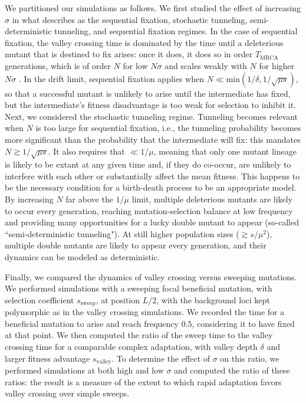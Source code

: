 \documentclass[rmp]{revtex4}
\begin{document}
We partitioned our simulations as follows.
We first studied the effect of increasing $\sigma$ in what \citet{weissman_2009} describes as the sequential fixation, stochastic tunneling, semi-deterministic tunneling, and sequential fixation regimes.
In the case of sequential fixation, the valley crossing time is dominated by the time until a deleterious mutant that is destined to fix arises: once it does, it does so in order $T_{\mathrm{MRCA}}$ generations, which is of order $N$ for low $N\sigma$ and scales weakly with $N$ for higher $N\sigma$ \citep{neher_hallatschek_2013}.
In the drift limit, sequential fixation applies when $N \ll \mathrm{min}(1/\delta, 1/\sqrt{\mu s})$, so that a successful mutant is unlikely to arise until the intermediate has fixed, but the intermediate's fitness disadvantage is too weak for selection to inhibit it.
Next, we considered the stochastic tunneling regime.
Tunneling becomes relevant when $N$ is too large for sequential fixation, i.e., the tunneling probability becomes more significant than the probability that the intermediate will fix: this mandates $N \gtrsim 1/\sqrt{\mu s}$.
It also requires that $\ll 1/\mu$, meaning that only one mutant lineage is likely to be extant at any given time and, if they do co-occur, are unlikely to interfere with each other or substantially affect the mean fitness.
This happens to be the necessary condition for a birth-death process to be an appropriate model.
By increasing $N$ far above the $1/\mu$ limit, multiple deleterious mutants are likely to occur every generation, reaching mutation-selection balance at low frequency and providing many opportunities for a lucky double mutant to appear (so-called ``semi-deterministic tunneling").
At still higher population sizes ($\gtrsim s/\mu^2$), multiple double mutants are likely to appear every generation, and their dynamics can be modeled as deterministic.

Finally, we compared the dynamics of valley crossing versus sweeping mutations.
We performed simulations with a sweeping focal beneficial mutation, with selection coefficient $s_{\mathrm{sweep}}$, at position $L/2$, with the background loci kept polymorphic as in the valley crossing simulations.
We recorded the time for a beneficial mutation to arise and reach frequency $0.5$, considering it to have fixed at that point.
We then computed the ratio of the sweep time to the valley crossing time for a comparable complex adaptation, with valley depth $\delta$ and larger fitness advantage $s_{\mathrm{valley}}$.
To determine the effect of $\sigma$ on this ratio, we performed simulations at both high and low $\sigma$ and computed the ratio of these ratios: the result is a measure of the extent to which rapid adaptation favors valley crossing over simple sweeps.
\end{document}
